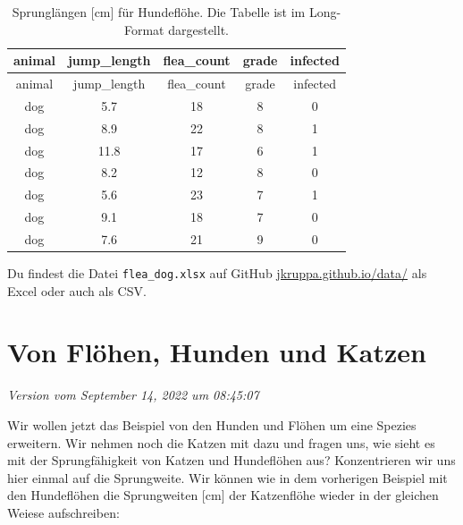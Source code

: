 \documentclass[
  letterpaper,
]{scrbook}
\begin{document}
\hypertarget{tbl-dog-long}{}
\begin{longtable}[]{@{}ccccc@{}}
\caption{\label{tbl-dog-long}Sprunglängen {[}cm{]} für Hundeflöhe. Die
Tabelle ist im Long-Format dargestellt.}\tabularnewline
\toprule()
animal & jump\_length & flea\_count & grade & infected \\
\midrule()
\endfirsthead
\toprule()
animal & jump\_length & flea\_count & grade & infected \\
\midrule()
\endhead
dog & 5.7 & 18 & 8 & 0 \\
dog & 8.9 & 22 & 8 & 1 \\
dog & 11.8 & 17 & 6 & 1 \\
dog & 8.2 & 12 & 8 & 0 \\
dog & 5.6 & 23 & 7 & 1 \\
dog & 9.1 & 18 & 7 & 0 \\
dog & 7.6 & 21 & 9 & 0 \\
\bottomrule()
\end{longtable}

\begin{tcolorbox}[enhanced jigsaw, coltitle=black, titlerule=0mm, bottomrule=.15mm, opacityback=0, opacitybacktitle=0.6, leftrule=.75mm, title=\textcolor{quarto-callout-tip-color}{\faLightbulb}\hspace{0.5em}{Datei für von Flöhen und Hunden}, toprule=.15mm, bottomtitle=1mm, toptitle=1mm, left=2mm, breakable, arc=.35mm, colback=white, rightrule=.15mm, colbacktitle=quarto-callout-tip-color!10!white, colframe=quarto-callout-tip-color-frame]
Du findest die Datei \texttt{flea\_dog.xlsx} auf GitHub
\href{https://github.com/jkruppa/jkruppa.github.io/tree/master/data}{jkruppa.github.io/data/}
als Excel oder auch als CSV.
\end{tcolorbox}

\hypertarget{sec-example-2}{%
\chapter{Von Flöhen, Hunden und Katzen}\label{sec-example-2}}

\emph{Version vom September 14, 2022 um 08:45:07}

Wir wollen jetzt das Beispiel von den Hunden und Flöhen um eine Spezies
erweitern. Wir nehmen noch die Katzen mit dazu und fragen uns, wie sieht
es mit der Sprungfähigkeit von Katzen und Hundeflöhen aus? Konzentrieren
wir uns hier einmal auf die Sprungweite. Wir können wie in dem
vorherigen Beispiel mit den Hundeflöhen die Sprungweiten {[}cm{]} der
Katzenflöhe wieder in der gleichen Weiese aufschreiben:
\end{document}
